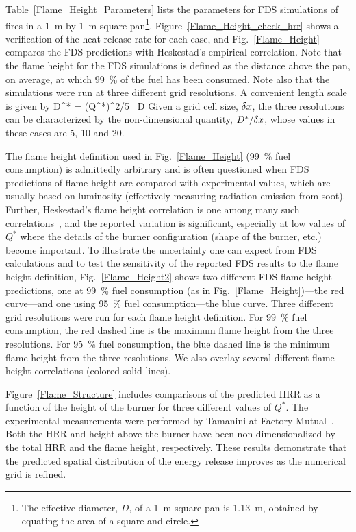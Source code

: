 Table~\ref{Flame_Height_Parameters} lists the parameters for FDS simulations of fires in a 1~m by 1~m square pan\footnote{The effective diameter, $D$, of a 1~m square pan is 1.13~m, obtained by equating the area of a square and circle.}. Figure~\ref{Flame_Height_check_hrr} shows a verification of the heat release rate for each case, and Fig.~\ref{Flame_Height} compares the FDS predictions with Heskestad's empirical correlation. Note that the flame height for the FDS simulations is defined as the distance above the pan, on average, at which 99~\% of the fuel has been consumed. Note also that the simulations were run at three different grid resolutions. A convenient length scale is given by
\be
   D^* = (Q^*)^{2/5} \, D
\ee
Given a grid cell size, $\delta x$, the three resolutions can be characterized by the non-dimensional quantity, $D^*/\delta x$, whose values in these cases are 5, 10 and 20.

The flame height definition used in Fig.~\ref{Flame_Height} (99~\% fuel consumption) is admittedly arbitrary and is often questioned when FDS predictions of flame height are compared with experimental values, which are usually based on luminosity (effectively measuring radiation emission from soot).  Further, Heskestad's flame height correlation is one among many such correlations~\cite{SFPE:Heskestad,Steward:1970,Becker:1978,Cox:1985,Hasemi:1984,Cetegen:1984,Delichatsios:1984}, and the reported variation is significant, especially at low values of $Q^*$ where the details of the burner configuration (shape of the burner, etc.) become important.  To illustrate the uncertainty one can expect from FDS calculations and to test the sensitivity of the reported FDS results to the flame height definition, Fig.~\ref{Flame_Height2} shows two different FDS flame height predictions, one at 99~\% fuel consumption (as in Fig.~\ref{Flame_Height})---the red curve---and one using 95~\% fuel consumption---the blue curve.  Three different grid resolutions were run for each flame height definition.  For 99~\% fuel consumption, the red dashed line is the maximum flame height from the three resolutions.  For 95~\% fuel consumption, the blue dashed line is the minimum flame height from the three resolutions.  We also overlay several different flame height correlations (colored solid lines).

Figure~\ref{Flame_Structure} includes comparisons of the predicted HRR as a function of the height of the burner for three different values of $Q^*$. The experimental measurements were performed by Tamanini at Factory Mutual~\cite{Tamanini:CF1983}. Both the HRR and height above the burner have been non-dimensionalized by the total HRR and the flame height, respectively. These results demonstrate that the predicted spatial distribution of the energy release improves as the numerical grid is refined.

